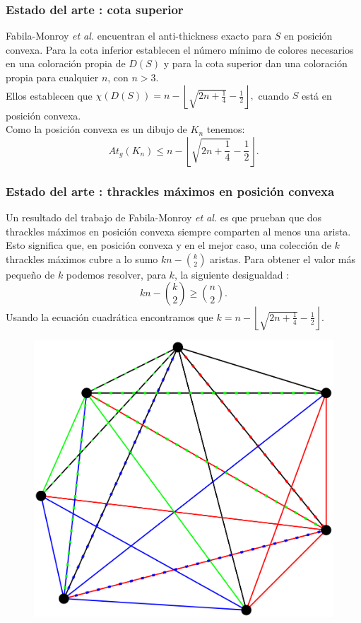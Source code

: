\begin{frame}
\frametitle{Estado del arte : cota superior}

Fabila-Monroy \emph{et al.} encuentran el anti-thickness exacto para $S$ en posición convexa. Para la cota inferior establecen el número mínimo de colores necesarios en una coloración propia de $D(S)$ y para la cota superior dan una coloración propia para cualquier $n$, con $n>3$.
\pause 
\\[10pt]
Ellos establecen que $\chi(D(S)) = n - \left\lfloor\sqrt{2n + \frac{1}{4}} - \frac{1}{2} \right\rfloor, $ cuando $S$ está en posición convexa.
\pause
\\[10pt]
Como la posición convexa es un dibujo de $K_n$ tenemos: \[At_g(K_n) \leq n - \left\lfloor\sqrt{2n + \frac{1}{4}} - \frac{1}{2} \right\rfloor. \]
\end{frame}
\begin{frame}
\frametitle{Estado del arte : thrackles máximos en posición convexa}
Un resultado del trabajo de Fabila-Monroy \emph{et al.} es que prueban que dos thrackles máximos en posición convexa siempre comparten al menos una arista. Esto significa que, en posición convexa y en el mejor caso, una colección de $k$ thrackles máximos cubre a lo sumo $kn - \binom{k}{2}$ aristas. Para obtener el valor más pequeño de $k$ podemos resolver, para $k$, la siguiente desigualdad :
\[
  kn - \binom{k}{2} \geq \binom{n}{2}.
\]
Usando la ecuación cuadrática encontramos que $k = n - \left\lfloor\sqrt{2n + \frac{1}{4}} - \frac{1}{2} \right\rfloor.$
\end{frame}
\begin{frame}
\begin{figure}
	\centering
	\includegraphics[width=0.75\linewidth]{images/thrackles_maximos}
\end{figure}
\end{frame}

